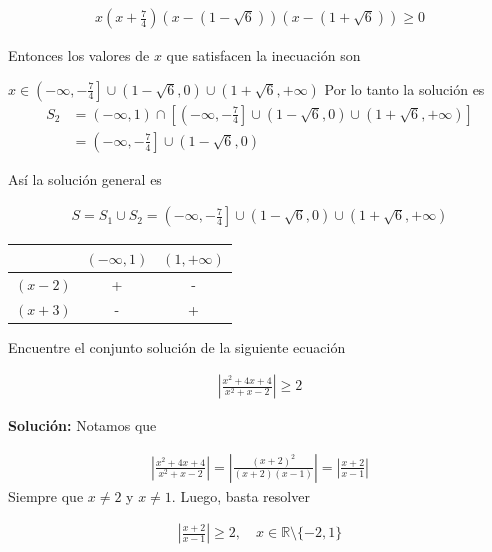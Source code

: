 \documentclass[12pt]{book}
\begin{document}
\begin{itemize}
\begin{align*}
    x\left(x+\frac{7}{4}\right)\left(x-(1-\sqrt{6}) \right)\left(x-(1+\sqrt{6}) \right) \geq 0 
\end{align*}

Entonces los valores de $x$ que satisfacen la inecuación son

$x \in \left(-\infty,-\frac{7}{4} \right]  \cup (1-\sqrt{6},0) \cup (1+\sqrt{6},+\infty)$
Por lo tanto la solución es
\begin{align*}
    S_2&= (-\infty, 1) \cap \left[\left(-\infty,-\frac{7}{4} \right]  \cup (1-\sqrt{6},0) \cup (1+\sqrt{6},+\infty) \right] \\
    &=\left(-\infty,-\frac{7}{4} \right] \cup (1-\sqrt{6},0)
\end{align*}
\end{itemize}
Así la solución general es

\begin{align*}
    S=S_1 \cup S_2 = \left(-\infty,-\frac{7}{4} \right]  \cup (1-\sqrt{6},0) \cup (1+\sqrt{6},+\infty)
\end{align*}

\begin{center}
\begin{tabular}{|c|c|c|}
\hline
   & $(-\infty,1) $  & $(1,+\infty)$  \\
   \hline
   $(x-2)$ & +  & - \\ \hline
   $(x+3)$ & - & + \\ 
   \hline
\end{tabular}
\end{center}

\begin{prob}{}{}
    Encuentre el conjunto solución de la siguiente ecuación 

    \begin{align*}
        \left|\frac{x^2+4x+4}{x^2+x-2}\right| \geq 2
    \end{align*}
\end{prob}
\textbf{Solución:} Notamos que 

\begin{align*}
    \left|\frac{x^2+4x+4}{x^2+x-2} \right|=\left|\frac{(x+2)^2}{(x+2)(x-1)} \right| = \left|\frac{x+2}{x-1} \right|
\end{align*}
Siempre que $x \neq 2$ y $x \neq 1$. Luego, basta resolver 

\begin{align*}
     \left|\frac{x+2}{x-1} \right| \geq 2, \quad x \in \mathbb{R}\setminus\{-2,1\}
\end{align*}
\end{document}
